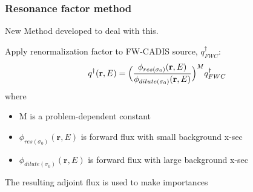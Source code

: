 \documentclass[xcolor=x11names,compress, handout]{beamer}
\renewcommand{\(}{\begin{columns}}
\renewcommand{\)}{\end{columns}}
\newcommand{\<}[1]{\begin{column}{#1}}
\renewcommand{\>}{\end{column}}
\newcommand{\ve}[1]{\ensuremath{\mathbf{#1}}}
\newcommand{\micro}{\ensuremath{\sigma}}
\begin{document}
\begin{frame}[fragile]
  \frametitle{Resonance factor method \cite{Wilson2015}}
  
  \alert{New Method} developed to deal with this. 
  \vspace{0.5 em}
  
  	Apply renormalization factor to FW-CADIS source, $q^{\dagger}_{FWC}$: 
	\begin{equation}
   	q^{\dagger}(\ve{r},E) = \Bigl(\frac{\phi_{res(\micro_0)}(\ve{r},E)}{\phi_{dilute(\micro_0)}(\ve{r},E)}\Bigr)^M q^{\dagger}_{FWC}  \nonumber
  	 \label{eq:newQ}
	\end{equation}
	where
	\begin{itemize}
  	\item M is a problem-dependent constant 
 	 \item $\phi_{res(\micro_0)}(\ve{r},E)$ is forward flux with small background x-sec
 	 \item $\phi_{dilute(\micro_0)}(\ve{r},E)$ is forward flux with large background x-sec
	\end{itemize}

	\vspace*{1 em}
	The resulting adjoint flux is used to make importances
	
	
\end{frame}


%  
%	
%  
\end{document}
